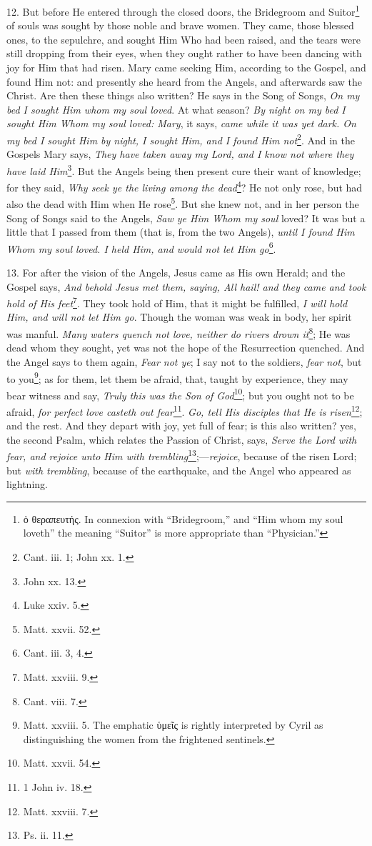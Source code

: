 12. But before He entered through the closed doors, the Bridegroom and Suitor\footnote{\textgreek{ὁ θεραπευτής.} In connexion with “Bridegroom,” and “Him whom my soul loveth” the meaning “Suitor” is more appropriate than “Physician.”} of souls was sought by those noble and brave women. They came, those blessed ones, to the sepulchre, and sought Him Who had been raised, and the tears were still dropping from their eyes, when they ought rather to have been dancing with joy for Him that had risen. Mary came seeking Him, according to the Gospel, and found Him not: and presently she heard from the Angels, and afterwards saw the Christ. Are then these things also written? He says in the Song of Songs, \emph{On my bed I sought Him whom my soul loved}. At what season? \emph{By night on my bed I sought Him Whom my soul loved: Mary}, it says, \emph{came while it was yet dark. On my bed I sought Him by night, I sought Him, and I found Him not}\footnote{Cant. iii. 1; John xx. 1.}. And in the Gospels Mary says, \emph{They have taken away my Lord, and I know not where they have laid Him}\footnote{John xx. 13.}. But the Angels being then present cure their want of knowledge; for they said, \emph{Why seek ye the living among the dead}\footnote{Luke xxiv. 5.}? He not only rose, but had also the dead with Him when He rose\footnote{Matt. xxvii. 52.}. But she knew not, and in her person the Song of Songs said to the Angels, \emph{Saw ye Him Whom my soul} loved? It was but a little that I passed from them (that is, from the two Angels), \emph{until I found Him Whom my soul loved. I held Him, and would not let Him go}\footnote{Cant. iii. 3, 4.}.

13. For after the vision of the Angels, Jesus came as His own Herald; and the Gospel says, \emph{And behold Jesus met them, saying, All hail! and they came and took hold of His feet}\footnote{Matt. xxviii. 9.}. They took hold of Him, that it might be fulfilled, \emph{I will hold Him, and will not let Him go}. Though the woman was weak in body, her spirit was manful. \emph{Many waters quench not love, neither do rivers drown it}\footnote{Cant. viii. 7.}; He was dead whom they sought, yet was not the hope of the Resurrection quenched. And the Angel says to them again, \emph{Fear not ye}; I say not to the soldiers, \emph{fear not}, but to you\footnote{Matt. xxviii. 5. The emphatic \textgreek{ὑμεῖς} is rightly interpreted by Cyril as distinguishing the women from the frightened sentinels.}; as for them, let them be afraid, that, taught by experience, they may bear witness and say, \emph{Truly this was the Son of God}\footnote{Matt. xxvii. 54.}; but you ought not to be afraid, \emph{for perfect love casteth out fear}\footnote{1 John iv. 18.}. \emph{Go, tell His disciples that He is risen}\footnote{Matt. xxviii. 7.}; and the rest. And they depart with joy, yet full of fear; is this also written? yes, the second Psalm, which relates the Passion of Christ, says, \emph{Serve the Lord with fear, and rejoice unto Him with trembling}\footnote{Ps. ii. 11.};—\emph{rejoice}, because of the risen Lord; but \emph{with trembling}, because of the earthquake, and the Angel who appeared as lightning.

